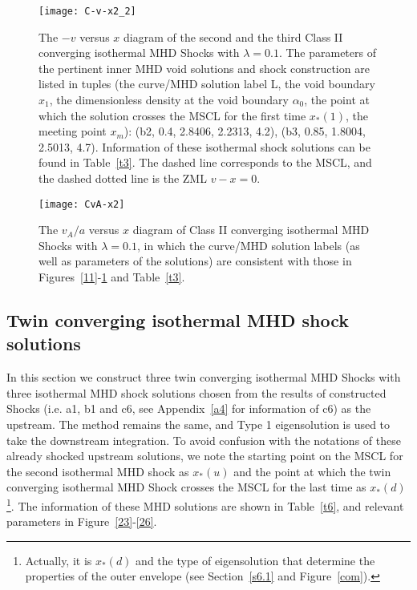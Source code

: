 \documentclass[fleqn,usenatbib]{mnras}
\begin{document}
\begin{figure}
\centering
\texttt{[image: C-v-x2\_2]}
\caption{The $-v$ versus $x$ diagram of the second and the third Class II converging isothermal MHD Shocks with $\lambda=0.1$. The parameters of the pertinent inner MHD void solutions and shock construction are listed in tuples (the curve/MHD solution label L, the void boundary $x_{1}$, the dimensionless density at the void boundary $\alpha_{0}$, the point at which the solution crosses the MSCL for the first time $x_{*}(1)$, the meeting point $x_{m}$): (b2, 0.4, 2.8406, 2.2313, 4.2), (b3, 0.85, 1.8004, 2.5013, 4.7). Information of these isothermal shock solutions can be found in Table~\ref{t3}. The dashed line corresponds to the MSCL, and the dashed dotted line is the ZML $v-x=0$.}
\label{12}
\end{figure}



\begin{figure}
\centering
\texttt{[image: CvA-x2]}
\caption{The $v_{A}/a$ versus $x$ diagram of Class II converging isothermal MHD Shocks with $\lambda=0.1$, in which the curve/MHD solution labels (as well as parameters of the solutions) are consistent with those in Figures~\ref{11}-\ref{12} and Table~\ref{t3}.}
\label{15}
\end{figure}




\subsection{Twin converging isothermal MHD shock solutions}
\label{s5.5}
In this section we construct three twin converging isothermal MHD Shocks with three isothermal MHD shock solutions chosen from the results of constructed Shocks (i.e. a1, b1 and c6, see Appendix~\ref{a4} for information of c6) as the upstream. The method remains the same, and Type 1 eigensolution is used to take the downstream integration. To avoid confusion with the notations of these already shocked upstream solutions, we note the starting point on the MSCL for the second isothermal MHD shock as $x_{*}(u)$ and the point at which the twin converging isothermal MHD Shock crosses the MSCL for the last time as $x_{*}(d)$\footnote{Actually, it is $x_{*}(d)$ and the type of eigensolution that determine the properties of the outer envelope (see Section~\ref{s6.1} and Figure~\ref{com}).}. The information of these MHD solutions are shown in Table~\ref{t6}, and relevant parameters in Figure~\ref{23}-\ref{26}.
\end{document}
